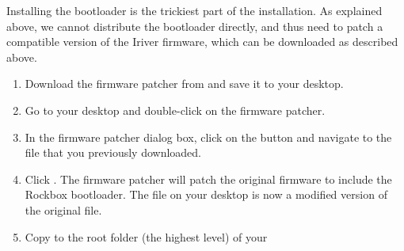 
  Installing the bootloader is the trickiest part of the installation.
  As explained above, we cannot distribute the bootloader directly, and
  thus need to patch a compatible version of the Iriver firmware, which
  can be downloaded as described above.


\begin{enumerate}
  \item Download the firmware patcher  from 
   and save it to your desktop.
  \item Go to your desktop and double-click on the firmware patcher.
  \item In the firmware patcher dialog box, click on the 
  button and navigate
  to the  file that you previously downloaded.
  \item Click . The firmware patcher will patch the
    original firmware to include the Rockbox bootloader. The 
    file on your desktop is now a modified version of the original
     file.
  \item Copy  to the root folder (the highest level) of your \dap{}
\end{enumerate}
